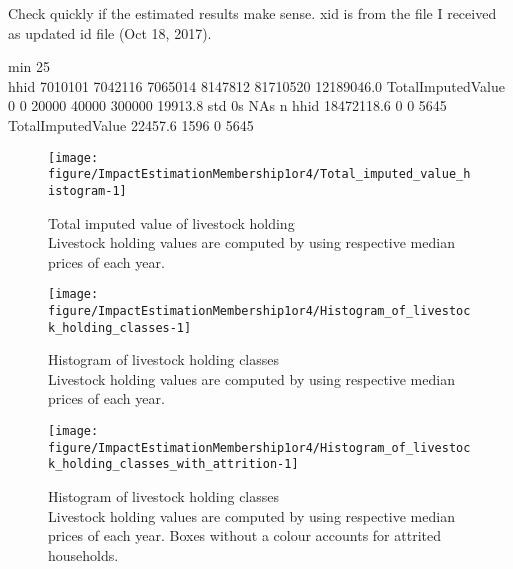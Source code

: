Check quickly if the estimated results make sense. \textsf{xid} is from the file I received as updated id file (Oct 18, 2017).
\begin{Schunk}
\begin{Soutput}
                      min   25\\%  median   75\\%      max       mean
hhid              7010101 7042116 7065014 8147812 81710520 12189046.0
TotalImputedValue       0       0   20000   40000   300000    19913.8
                         std   0s NAs    n
hhid              18472118.6    0   0 5645
TotalImputedValue    22457.6 1596   0 5645
\end{Soutput}
\end{Schunk}
\begin{Schunk}
\begin{figure}

{\centering \texttt{[image: figure/ImpactEstimationMembership1or4/Total\_imputed\_value\_histogram-1]} 

}

\caption{Total imputed value of livestock holding\\ {\footnotesize Livestock holding values are computed by using respective median prices of each year.\setlength{\baselineskip}{8pt}}}\label{Figure Total imputed value histogram}
\end{figure}
\end{Schunk}
\begin{Schunk}
\begin{figure}

{\centering \texttt{[image: figure/ImpactEstimationMembership1or4/Histogram\_of\_livestock\_holding\_classes-1]} 

}

\caption{Histogram of livestock holding classes\\ {\footnotesize Livestock holding values are computed by using respective median prices of each year.\setlength{\baselineskip}{8pt}}}\label{Figure Histogram of livestock holding classes}
\end{figure}
\end{Schunk}
\begin{Schunk}
\begin{figure}

{\centering \texttt{[image: figure/ImpactEstimationMembership1or4/Histogram\_of\_livestock\_holding\_classes\_with\_attrition-1]} 

}

\caption{Histogram of livestock holding classes\\ {\footnotesize Livestock holding values are computed by using respective median prices of each year. Boxes without a colour accounts for attrited households.\setlength{\baselineskip}{8pt}}}\label{Figure Histogram of livestock holding classes with attrition}
\end{figure}
\end{Schunk}
